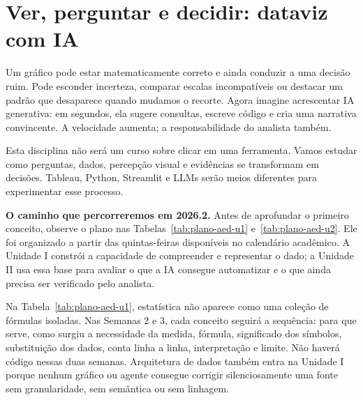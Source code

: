 \chapter{Ver, perguntar e decidir: dataviz com IA}

Um gráfico pode estar matematicamente correto e ainda conduzir a uma decisão ruim. Pode esconder incerteza, comparar escalas incompatíveis ou destacar um padrão que desaparece quando mudamos o recorte. Agora imagine acrescentar IA generativa: em segundos, ela sugere consultas, escreve código e cria uma narrativa convincente. A velocidade aumenta; a responsabilidade do analista também.

Esta disciplina não será um curso sobre clicar em uma ferramenta. Vamos estudar como perguntas, dados, percepção visual e evidências se transformam em decisões. Tableau, Python, Streamlit e LLMs serão meios diferentes para experimentar esse processo.

\bigskip
\noindent\textbf{O caminho que percorreremos em 2026.2.} Antes de aprofundar o primeiro conceito, observe o plano nas Tabelas~\ref{tab:plano-aed-u1} e~\ref{tab:plano-aed-u2}. Ele foi organizado a partir das quintas-feiras disponíveis no calendário acadêmico. A Unidade I constrói a capacidade de compreender e representar o dado; a Unidade II usa essa base para avaliar o que a IA consegue automatizar e o que ainda precisa ser verificado pelo analista.

Na Tabela~\ref{tab:plano-aed-u1}, estatística não aparece como uma coleção de fórmulas isoladas. Nas Semanas 2 e 3, cada conceito seguirá a sequência: para que serve, como surgiu a necessidade da medida, fórmula, significado dos símbolos, substituição dos dados, conta linha a linha, interpretação e limite. Não haverá código nessas duas semanas. Arquitetura de dados também entra na Unidade I porque nenhum gráfico ou agente consegue corrigir silenciosamente uma fonte sem granularidade, sem semântica ou sem linhagem.

